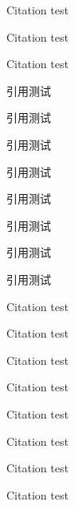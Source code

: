 \documentclass[degree=doctor,fontset=fandol]{ustcthesis}
\begin{document}
\START
\showoutput

Citation \cite{baker1995future} test\par
Citation \cite{baker1995future} test\par
Citation \cite{baker1995future} test\par

引用\citet{yangzongying1996dianzi}测试\par
引用\citet[42]{yangzongying1996dianzi}测试\par
引用\citep{yangzongying1996dianzi}测试\par
引用\citep[42]{yangzongying1996dianzi}测试\par
引用\citep[见][]{yangzongying1996dianzi}测试\par
引用\citep[见][42]{yangzongying1996dianzi}测试\par
引用\citet*{yangzongying1996dianzi}测试\par
引用\citep*{yangzongying1996dianzi}测试\par

Citation \citet{baker1995future} test\par
Citation \citet[42]{baker1995future} test\par
Citation \citep{baker1995future} test\par
Citation \citep[42]{baker1995future} test\par
Citation \citep[see][]{baker1995future} test\par
Citation \citep[see][42]{baker1995future} test\par
Citation \citet*{baker1995future} test\par
Citation \citep*{baker1995future} test\par

\nocite{*}

\backmatter
\printbibliography

\clearpage
\end{document}
